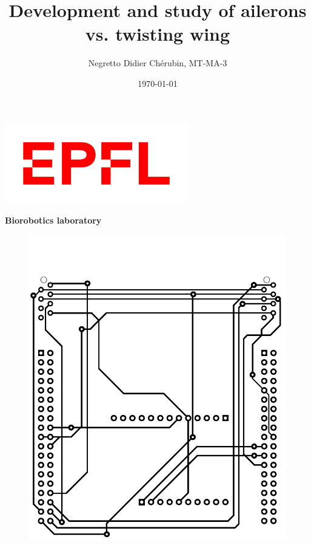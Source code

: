 \documentclass[12pt,a4paper, twoside]{article}
\title{Development and study of ailerons vs. twisting wing}
\author{\large{Negretto Didier Chérubin, MT-MA-3}}
\begin{document}
	\date{\today}
\begin{titlepage}
\hspace{+2.8cm} %
\pagecolor{titlepagecolor}
\noindent
\begin{center}
\includegraphics[width=8cm]{fig/EPFL_Logo_Digital_RGB_PROD.jpg}\\[-1em]
\color{black}
\par
\noindent
\hspace{-30cm}
\makebox[3pt][l]{\rule{19 cm}{1pt}}
\par
\noindent
\textbf{\Large \textsf{Biorobotics laboratory}}\\
\end{center}
\vspace{0.5cm}
\hspace{-3.5cm}
	\begin{figure}[H]
    	\centering
		\includegraphics[width=12 cm]{fig/front.pdf}
	\end{figure}


\end{titlepage}
\end{document}
